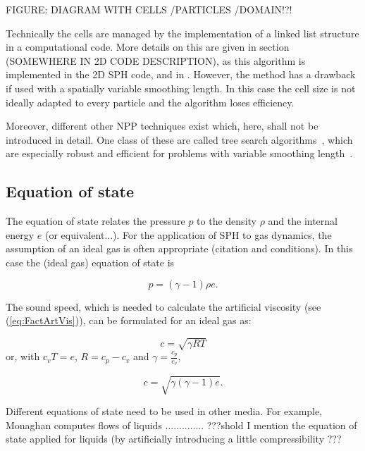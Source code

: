 \documentclass{report}
\begin{document}
FIGURE: DIAGRAM WITH CELLS /PARTICLES /DOMAIN!?!

Technically the cells are managed by the implementation of a linked list
structure in a computational code. More details on this are given in section
(SOMEWHERE IN 2D CODE DESCRIPTION), as this algorithm is implemented in the 2D
SPH code, and in \cite{Monaghan1985, Hockney1988}.
However, the method has a drawback if used with a spatially variable smoothing
length. In this case the cell size is not ideally adapted to every particle
and the algorithm loses efficiency.

Moreover, different other NPP techniques exist which, here, shall not be introduced in
detail. One class of these are called tree search algorithms~\cite{Hernquist1989}, which are
especially robust and efficient for problems with variable smoothing
length~\cite{Liu2003}.



\subsection{Equation of state}


The equation of state relates the pressure $p$ 
to the density $\rho$ and the internal energy $e$ (or equivalent...). For the 
application of SPH to gas dynamics, the assumption of an ideal gas is often
appropriate (citation and conditions). In this case the (ideal gas) equation of state is



\begin{equation}
 p=(\gamma-1)\rho e.
\end{equation}

The sound speed, which is needed to calculate the artificial viscosity (see (\ref{eq:FactArtVis})), can be formulated for an ideal gas as:

\begin{equation}
 c=\sqrt{\gamma R T}
\end{equation}
or, with $c_v T=e$, $R=c_p-c_v$ and $\gamma=\frac{c_p}{c_v}$,

\begin{equation}
 c=\sqrt{\gamma(\gamma-1)e}.
\end{equation}

Different equations of state need to be used in other media. For example, Monaghan
computes flows of liquids ..............
???shold I mention the equation of state applied for liquids (by artificially
introducing a little compressibility \cite{Monaghan1994,Monaghan2005}???
\end{document}
